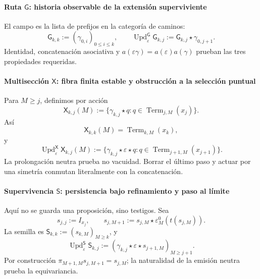 \paragraph{Ruta \(\mathsf G\): historia observable de la extensión superviviente}
El campo es la lista de prefijos en la categoría de caminos:
\begin{equation}
\label{eq:pdfv2-terminal-update-g}
 \mathsf G_{k,k}:=(\gamma_{0,i})_{0\leq i\leq k},\qquad
 \operatorname{Upd}^{\mathsf G}_{\varepsilon}\mathsf G_{k,j}
 :=\mathsf G_{k,j}\star\gamma_{0,j+1}.
\end{equation}
Identidad, concatenación asociativa y
\(a(\varepsilon\gamma)=a(\varepsilon)a(\gamma)\) prueban las tres
propiedades requeridas.

\paragraph{Multisección \(\mathsf X\): fibra finita estable y obstrucción a la selección puntual}
Para \(M\geq j\), definimos por acción
\begin{equation}
\label{eq:pdfv2-terminal-multiseccion-interna}
 \mathsf X_{k,j}(M):=
 \{\gamma_{k,j}\star q:
 q\in\operatorname{Term}_{j,M}(x_j)\}.
\end{equation}
Así
\[
 \mathsf X_{k,k}(M)=\operatorname{Term}_{k,M}(x_k),
\]
y
\begin{equation}
\label{eq:pdfv2-terminal-update-x}
 \operatorname{Upd}^{\mathsf X}_{\varepsilon}\mathsf X_{k,j}(M)
 :=
 \{\gamma_{k,j}\star\varepsilon\star q:
 q\in\operatorname{Term}_{j+1,M}(x_{j+1})\}.
\end{equation}
La prolongación neutra prueba no vacuidad. Borrar el último paso y actuar
por una simetría conmutan literalmente con la concatenación.

\paragraph{Supervivencia \(\mathsf S\): persistencia bajo refinamiento y paso al límite}
Aquí no se guarda una proposición, sino testigos. Sea
\begin{equation}
\label{eq:pdfv2-terminal-testigo-neutro}
 s_{j,j}:=I_{x_j},\qquad
 s_{j,M+1}:=s_{j,M}\star
 \varepsilon_M^0(t(s_{j,M})).
\end{equation}
La semilla es
\(\mathsf S_{k,k}:=(s_{k,M})_{M\geq k}\), y
\begin{equation}
\label{eq:pdfv2-terminal-update-s}
 \operatorname{Upd}^{\mathsf S}_{\varepsilon}\mathsf S_{k,j}
 :=(\gamma_{k,j}\star\varepsilon\star s_{j+1,M})_{M\geq j+1}.
\end{equation}
Por construcción
\(\pi_{M+1,M}s_{j,M+1}=s_{j,M}\); la naturalidad de la emisión neutra
prueba la equivariancia.

